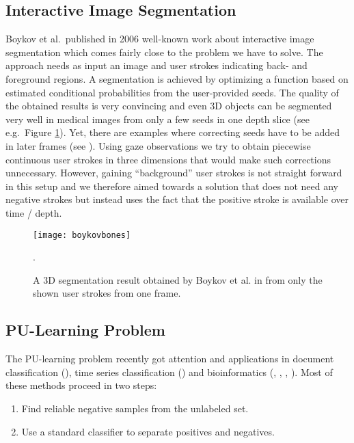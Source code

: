 \subsection{Interactive Image Segmentation}
Boykov et al.\ published in 2006 well-known work \cite{boykov2006graph} about interactive image segmentation which comes fairly close to the problem we have to solve. 
The approach needs as input an image and user strokes indicating back- and foreground regions. 
A segmentation is achieved by optimizing a function based on estimated conditional probabilities from the user-provided seeds. 
The quality of the obtained results is very convincing and even 3D objects can be segmented very well in medical images from only a few seeds in one depth slice (see e.g.\ Figure \ref{fig:boykovbones}). 
Yet, there are examples where correcting seeds have to be added in later frames (see \cite[Section~Experimental Results]{boykov2006graph}). 
Using gaze observations we try to obtain piecewise continuous user strokes in three dimensions that would make such corrections unnecessary. However, gaining ``background'' user strokes is not straight forward in this setup and we therefore aimed towards a solution that does not need any negative strokes but instead uses the fact that the positive stroke is available over time / depth.

\begin{figure}[ht]
	\centering
	\texttt{[image: boykovbones]}
	\caption{A 3D segmentation result obtained by Boykov et al. in \cite{boykov2006graph} from only the shown user strokes from one frame.}.
	\label{fig:boykovbones}
\end{figure}

\subsection{PU-Learning Problem}
The PU-learning problem recently got attention and applications in document classification (\cite{li2003learning}), time series classification (\cite{nguyen2011positive}) and bioinformatics (\cite{elkan2008learning}, \cite{yang2012positive}, \cite{yang2014ensemble}, \cite{yousef2015novel}). 
Most of these methods proceed in two steps: 
\begin{enumerate}
 \item Find reliable negative samples from the unlabeled set.
 \item Use a standard classifier to separate positives and negatives.
\end{enumerate}

